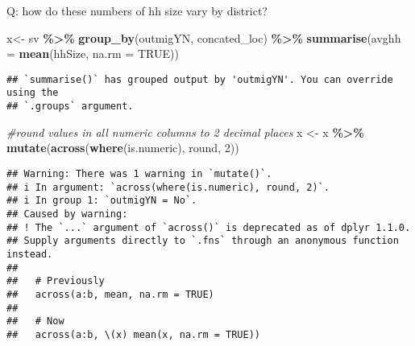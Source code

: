 \documentclass[
]{article}
\newenvironment{Shaded}{\begin{snugshade}}{\end{snugshade}}
\newcommand{\AttributeTok}[1]{\textcolor[rgb]{0.13,0.29,0.53}{#1}}
\newcommand{\CommentTok}[1]{\textcolor[rgb]{0.56,0.35,0.01}{\textit{#1}}}
\newcommand{\ConstantTok}[1]{\textcolor[rgb]{0.56,0.35,0.01}{#1}}
\newcommand{\DecValTok}[1]{\textcolor[rgb]{0.00,0.00,0.81}{#1}}
\newcommand{\FunctionTok}[1]{\textcolor[rgb]{0.13,0.29,0.53}{\textbf{#1}}}
\newcommand{\NormalTok}[1]{#1}
\newcommand{\OtherTok}[1]{\textcolor[rgb]{0.56,0.35,0.01}{#1}}
\newcommand{\SpecialCharTok}[1]{\textcolor[rgb]{0.81,0.36,0.00}{\textbf{#1}}}
\newcommand{\StringTok}[1]{\textcolor[rgb]{0.31,0.60,0.02}{#1}}
\begin{document}
Q: how do these numbers of hh size vary by district?

\begin{Shaded}
\begin{Highlighting}[]
\NormalTok{x}\OtherTok{\textless{}{-}}\NormalTok{ sv }\SpecialCharTok{\%\textgreater{}\%} \FunctionTok{group\_by}\NormalTok{(outmigYN, concated\_loc) }\SpecialCharTok{\%\textgreater{}\%} 
  \FunctionTok{summarise}\NormalTok{(}\AttributeTok{avghh =} \FunctionTok{mean}\NormalTok{(hhSize, }\AttributeTok{na.rm =} \ConstantTok{TRUE}\NormalTok{)) }
\end{Highlighting}
\end{Shaded}

\begin{verbatim}
## `summarise()` has grouped output by 'outmigYN'. You can override using the
## `.groups` argument.
\end{verbatim}

\begin{Shaded}
\begin{Highlighting}[]
\CommentTok{\#round values in all numeric columns to 2 decimal places}
\NormalTok{x }\OtherTok{\textless{}{-}}\NormalTok{ x }\SpecialCharTok{\%\textgreater{}\%} \FunctionTok{mutate}\NormalTok{(}\FunctionTok{across}\NormalTok{(}\FunctionTok{where}\NormalTok{(is.numeric), round, }\DecValTok{2}\NormalTok{))}
\end{Highlighting}
\end{Shaded}

\begin{verbatim}
## Warning: There was 1 warning in `mutate()`.
## i In argument: `across(where(is.numeric), round, 2)`.
## i In group 1: `outmigYN = No`.
## Caused by warning:
## ! The `...` argument of `across()` is deprecated as of dplyr 1.1.0.
## Supply arguments directly to `.fns` through an anonymous function instead.
## 
##   # Previously
##   across(a:b, mean, na.rm = TRUE)
## 
##   # Now
##   across(a:b, \(x) mean(x, na.rm = TRUE))
\end{verbatim}

\begin{Shaded}
\end{Shaded}
\end{document}
